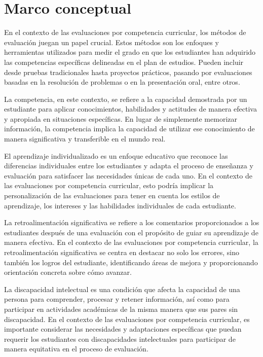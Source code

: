 
\section{Marco conceptual}

En el contexto de las evaluaciones por competencia curricular, los métodos de evaluación juegan un papel crucial. Estos métodos son los enfoques y herramientas utilizados para medir el grado en que los estudiantes han adquirido las competencias específicas delineadas en el plan de estudios. Pueden incluir desde pruebas tradicionales hasta proyectos prácticos, pasando por evaluaciones basadas en la resolución de problemas o en la presentación oral, entre otros.

La competencia, en este contexto, se refiere a la capacidad demostrada por un estudiante para aplicar conocimientos, habilidades y actitudes de manera efectiva y apropiada en situaciones específicas. En lugar de simplemente memorizar información, la competencia implica la capacidad de utilizar ese conocimiento de manera significativa y transferible en el mundo real.

El aprendizaje individualizado es un enfoque educativo que reconoce las diferencias individuales entre los estudiantes y adapta el proceso de enseñanza y evaluación para satisfacer las necesidades únicas de cada uno. En el contexto de las evaluaciones por competencia curricular, esto podría implicar la personalización de las evaluaciones para tener en cuenta los estilos de aprendizaje, los intereses y las habilidades individuales de cada estudiante.

La retroalimentación significativa se refiere a los comentarios proporcionados a los estudiantes después de una evaluación con el propósito de guiar su aprendizaje de manera efectiva. En el contexto de las evaluaciones por competencia curricular, la retroalimentación significativa se centra en destacar no solo los errores, sino también los logros del estudiante, identificando áreas de mejora y proporcionando orientación concreta sobre cómo avanzar.

La discapacidad intelectual es una condición que afecta la capacidad de una persona para comprender, procesar y retener información, así como para participar en actividades académicas de la misma manera que sus pares sin discapacidad. En el contexto de las evaluaciones por competencia curricular, es importante considerar las necesidades y adaptaciones específicas que puedan requerir los estudiantes con discapacidades intelectuales para participar de manera equitativa en el proceso de evaluación.


